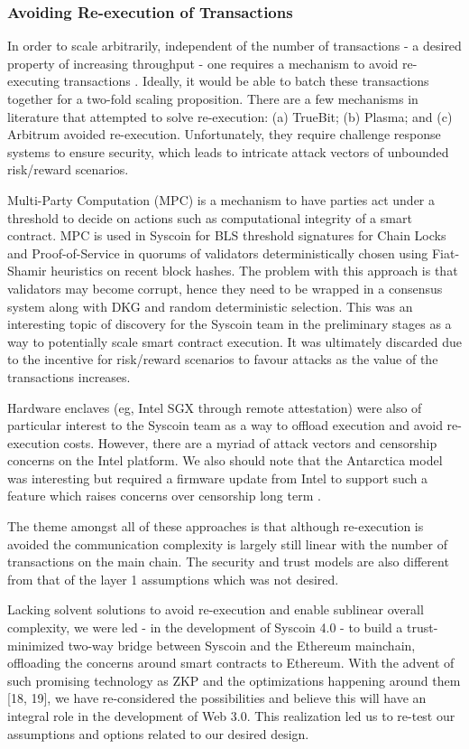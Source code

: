 \documentclass[peerreview]{ieeesyscoin}
\begin{document}
\subsubsection{Avoiding Re-execution of Transactions}

In order to scale arbitrarily, independent of the number of transactions - a desired property of increasing throughput - one requires a mechanism to avoid re-executing transactions \cite{Bow18}. Ideally, it would be able to batch these transactions together for a two-fold scaling proposition. There are a few mechanisms in literature that attempted to solve re-execution: (a) TrueBit; (b) Plasma; and (c) Arbitrum avoided re-execution. Unfortunately, they require challenge response systems to ensure security, which leads to intricate attack vectors of unbounded risk/reward scenarios. 

Multi-Party Computation (MPC) is a mechanism to have parties act under a threshold to decide on actions such as computational integrity of a smart contract. MPC is used in Syscoin for BLS threshold signatures for Chain Locks and Proof-of-Service in quorums of validators deterministically chosen using Fiat-Shamir heuristics on recent block hashes. The problem with this approach is that validators may become corrupt, hence they need to be wrapped in a consensus system along with DKG and random deterministic selection. This was an interesting topic of discovery for the Syscoin team in the preliminary stages as a way to potentially scale smart contract execution.  It was ultimately discarded due to the incentive for risk/reward scenarios to favour attacks as the value of the transactions increases.

Hardware enclaves (eg, Intel SGX through remote attestation) were also of particular interest to the Syscoin team as a way to offload execution and avoid re-execution costs. However, there are a myriad of attack vectors and censorship concerns on the Intel platform. We also should note that the Antarctica model was interesting but required a firmware update from Intel to support such a feature which raises concerns over censorship long term \cite{Nil20}.

The theme amongst all of these approaches is that although re-execution is avoided the communication complexity is largely still linear with the number of transactions on the main chain. The security and trust models are also different from that of the layer 1 assumptions which was not desired.

Lacking solvent solutions to avoid re-execution and enable sublinear overall complexity, we were led - in the development of Syscoin 4.0 - to build a trust-minimized two-way bridge between Syscoin and the Ethereum mainchain, offloading the concerns around smart contracts to Ethereum. With the advent of such promising technology as ZKP and the optimizations happening around them [18, 19], we have re-considered the possibilities and believe this will have an integral role in the development of Web 3.0. This realization led us to re-test our assumptions and options related to our desired design.
\end{document}

